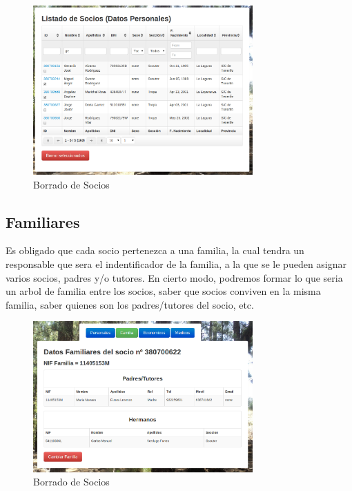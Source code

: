 \begin{figure}[H]
\begin{center}
\includegraphics[width=0.75\textwidth]{images/borrado_socios.jpg}
\caption{Borrado de Socios}
\label{fig:ArbolBinario}
\end{center}
\end{figure}

\subsection{Familiares}

Es obligado que cada socio pertenezca a una familia, la cual tendra un responsable que sera el indentificador de la familia, a la que se le pueden asignar varios socios, padres y/o tutores. En cierto modo, podremos
formar lo que seria un arbol de familia entre los socios, saber que socios conviven en la misma familia, saber quienes son los padres/tutores del socio, etc.\\

\begin{figure}[H]
\begin{center}
\includegraphics[width=0.75\textwidth]{images/familia_socio.jpg}
\caption{Borrado de Socios}
\label{fig:ArbolBinario}
\end{center}
\end{figure}

